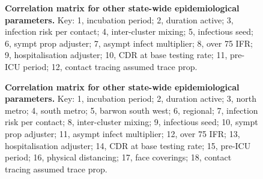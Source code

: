 \begin{figure}[ht]
    \caption{\textbf{Correlation matrix for other state-wide epidemiological parameters.} Key: 1, incubation period; 2, duration active; 3, infection risk per contact; 4, inter-cluster mixing; 5, infectious seed; 6, sympt prop adjuster; 7, asympt infect multiplier; 8, over 75 IFR; 9, hospitalisation adjuster; 10, CDR at base testing rate; 11, pre-ICU period; 12, contact tracing assumed trace prop.}
\end{figure}

\begin{figure}[ht]
    \caption{\textbf{Correlation matrix for other state-wide epidemiological parameters.} Key: 1, incubation period; 2, duration active; 3, north metro; 4, south metro; 5, barwon south west; 6, regional; 7, infection risk per contact; 8, inter-cluster mixing; 9, infectious seed; 10, sympt prop adjuster; 11, asympt infect multiplier; 12, over 75 IFR; 13, hospitalisation adjuster; 14, CDR at base testing rate; 15, pre-ICU period; 16, physical distancing; 17, face coverings; 18, contact tracing assumed trace prop.}
\end{figure}

